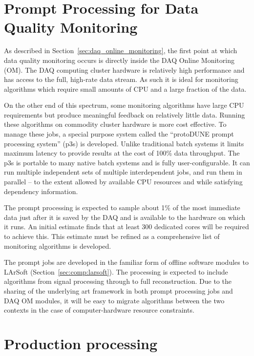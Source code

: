 \section{Prompt Processing for Data Quality Monitoring}
\label{sec:prompt_processing}

As described in Section~\ref{sec:daq_online_monitoring}, the first
point at which data quality monitoring occurs is directly inside the
DAQ Online Monitoring (OM).  The DAQ computing cluster hardware is
relatively high performance and has access to the full, high-rate data
stream.  As such it is ideal for monitoring algorithms which require
small amounts of CPU and a large fraction of the data.

On the other end of this spectrum, some monitoring algorithms have
large CPU requirements but produce meaningful feedback on relatively
little data.  Running these algorithms on commodity cluster hardware
is more cost effective.  To manage these jobs, a special purpose system
called the ``protoDUNE prompt processing system'' (p3s) is developed.
Unlike traditional batch systems it limits maximum latency to provide
results at the cost of 100\% data throughput.  The p3s is portable to many 
native batch systems and is fully
  user-configurable.  It can run multiple independent sets of multiple
  interdependent jobs, and run them in parallel -- to the
  extent allowed by available CPU resources and while satisfying dependency information.

The prompt processing is expected to sample about 1\% of the most
immediate data just after it is saved by the DAQ and is available to the
hardware on which it runs.  An initial estimate finds that at least
300 dedicated cores will be required to achieve this.  This estimate
must be refined as a comprehensive list of monitoring algorithms is
developed.

The prompt jobs are developed in the familiar form of offline software
modules to LArSoft (Section~\ref{sec:comp:larsoft}).  The processing is expected to include algorithms
from signal processing through to full reconstruction.  Due to the
sharing of the underlying art framework in both prompt processing jobs and
DAQ OM modules, it will be easy to migrate algorithms between the two
contexts in the case of computer-hardware resource constraints.

\section{Production processing}
\label{sec:protodune-offline}

